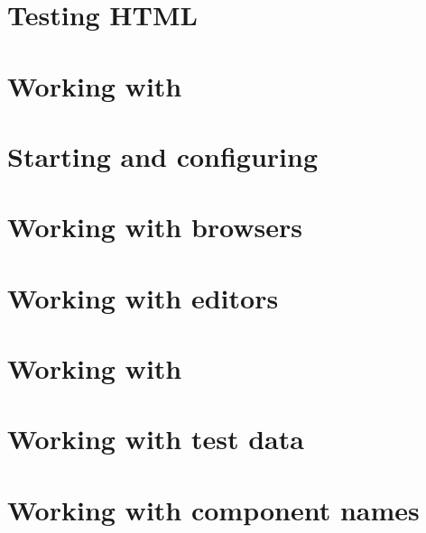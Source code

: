 \section{Testing HTML \gdauts{}}
\label{webaut}


\clearpage
\section{Working with \gdprojects{}}
\label{WorkingWithProjects}


\clearpage
\section{Starting and configuring \gdauts{}}
\label{StartAUT}


\clearpage
\section{Working with browsers}
\label{WorkingWithBrowsers}


\section{Working with editors}
\label{WorkingWithEditors}


\clearpage
\section{Working with \gdcases{}}
\label{WorkingWithTestCases}


\clearpage

\section{Working with test data}
\label{WorkingWithData}


\clearpage

\section{Working with component names}
\label{reass}



